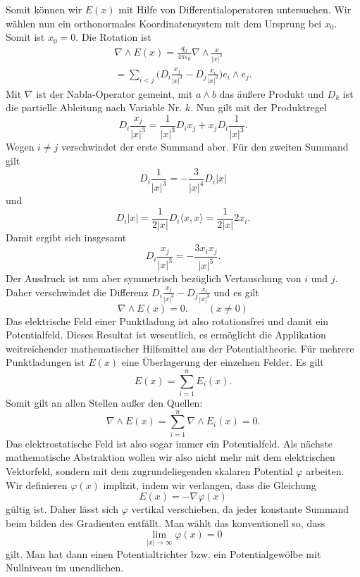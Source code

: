 \documentclass[a4paper,10pt,fleqn,twocolumn,twoside]{article}
\begin{document}
Somit können wir $E(x)$ mit Hilfe von Differentialoperatoren
untersuchen. Wir wählen nun ein orthonormales Koordinatensystem
mit dem Ursprung bei $x_0$. Somit ist $x_0=0$. Die Rotation
ist
\begin{gather*}
\nabla\wedge E(x)
= \frac{q_0}{4\pi\varepsilon_0}\nabla\wedge\frac{x}{|x|^3}\\
= \sum_{i<j} \Big(D_i\frac{x_j}{|x|^3}-D_j\frac{x_i}{|x|^3}\Big)
e_i\wedge e_j.
\end{gather*}
Mit $\nabla$ ist der Nabla-Operator gemeint, mit $a\wedge b$
das äußere Produkt und $D_k$ ist die partielle Ableitung nach
Variable Nr. $k$. Nun gilt mit der Produktregel
\[D_i \frac{x_j}{|x|^3}
= \frac{1}{|x|^3}D_i x_j+x_jD_i\frac{1}{|x|^3}.\]
Wegen $i\ne j$ verschwindet der erste Summand aber.
Für den zweiten Summand gilt
\[D_i\frac{1}{|x|^3} = -\frac{3}{|x|^4}D_i|x|\]
und
\[D_i|x| = \frac{1}{2|x|}D_i\langle x,x\rangle
= \frac{1}{2|x|} 2x_i.\]
Damit ergibt sich insgesamt
\[D_i \frac{x_j}{|x|^3}
= -\frac{3x_ix_j}{|x|^5}.\]
Der Ausdruck ist nun aber symmetrisch bezüglich Vertauschung
von $i$ und $j$. Daher verschwindet die Differenz
$D_i\frac{x_j}{|x|^3}-D_j\frac{x_i}{|x|^3}$
und es gilt
\begin{equation}
\nabla\wedge E(x)=0.\qquad (x\ne 0)
\end{equation}
Das elektrische Feld einer Punktladung ist also rotationsfrei
und damit ein Potentialfeld. Dieses Resultat ist wesentlich, es
ermöglicht die Applikation weitreichender mathematischer Hilfsmittel
aus der Potentialtheorie. Für mehrere Punktladungen ist
$E(x)$ eine Überlagerung der einzelnen Felder. Es gilt
\[E(x) = \sum_{i=1}^n E_i(x).\]
Somit gilt an allen Stellen außer den Quellen:
\[\nabla\wedge E(x) = \sum_{i=1}^n \nabla\wedge E_i(x)=0.\]
Das elektrostatische Feld ist also sogar immer ein
Potentialfeld. Als nächste mathematische Abstraktion wollen wir
also nicht mehr mit dem elektrischen Vektorfeld, sondern mit
dem zugrundeliegenden skalaren Potential $\varphi$ arbeiten.
Wir definieren $\varphi(x)$ implizit, indem wir verlangen, dass die
Gleichung
\begin{equation}\label{eq:phi-implizit}
E(x)=-\nabla\varphi(x)
\end{equation}
gültig ist. Daher lässt sich $\varphi$ vertikal verschieben, da
jeder konstante Summand beim bilden des Gradienten entfällt.
Man wählt das konventionell so, dass
\[\lim_{|x|\rightarrow\infty}\varphi(x)=0\]
gilt. Man hat dann einen Potentialtrichter bzw.
ein Potentialgewölbe mit Nullniveau im unendlichen.
\end{document}
